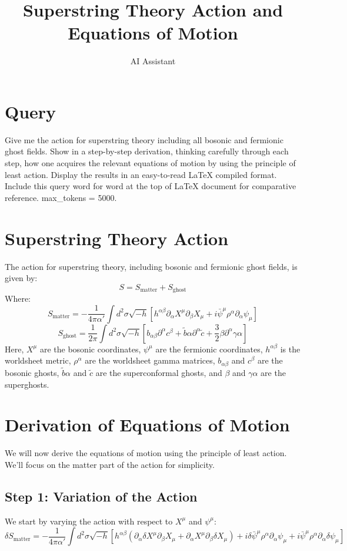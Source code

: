 \documentclass{article}
\title{Superstring Theory Action and Equations of Motion}
\author{AI Assistant}
\begin{document}
\maketitle
\section{Query}
Give me the action for superstring theory including all bosonic and fermionic ghost fields. Show in a step-by-step derivation, thinking carefully through each step, how one acquires the relevant equations of motion by using the principle of least action. Display the results in an easy-to-read LaTeX compiled format. Include this query word for word at the top of LaTeX document for comparative reference. max_tokens = 5000.
\section{Superstring Theory Action}
The action for superstring theory, including bosonic and fermionic ghost fields, is given by:
\begin{equation}
S = S_{\text{matter}} + S_{\text{ghost}}
\end{equation}
Where:
\begin{equation}
S_{\text{matter}} = -\frac{1}{4\pi\alpha'} \int d^2\sigma \sqrt{-h} \left[ h^{\alpha\beta} \partial_\alpha X^\mu \partial_\beta X_\mu + i \bar{\psi}^\mu \rho^\alpha \partial_\alpha \psi_\mu \right]
\end{equation}
\begin{equation}
S_{\text{ghost}} = \frac{1}{2\pi} \int d^2\sigma \sqrt{-h} \left[ b_{\alpha\beta} \partial^\alpha c^\beta + \tilde{b}\alpha \partial^\alpha \tilde{c} + \frac{3}{2} \beta \partial^\alpha \gamma\alpha \right]
\end{equation}
Here, $X^\mu$ are the bosonic coordinates, $\psi^\mu$ are the fermionic coordinates, $h^{\alpha\beta}$ is the worldsheet metric, $\rho^\alpha$ are the worldsheet gamma matrices, $b_{\alpha\beta}$ and $c^\beta$ are the bosonic ghosts, $\tilde{b}\alpha$ and $\tilde{c}$ are the superconformal ghosts, and $\beta$ and $\gamma\alpha$ are the superghosts.
\section{Derivation of Equations of Motion}
We will now derive the equations of motion using the principle of least action. We'll focus on the matter part of the action for simplicity.
\subsection{Step 1: Variation of the Action}
We start by varying the action with respect to $X^\mu$ and $\psi^\mu$:
\begin{equation}
\delta S_{\text{matter}} = -\frac{1}{4\pi\alpha'} \int d^2\sigma \sqrt{-h} \left[ h^{\alpha\beta} (\partial_\alpha \delta X^\mu \partial_\beta X_\mu + \partial_\alpha X^\mu \partial_\beta \delta X_\mu) + i \delta\bar{\psi}^\mu \rho^\alpha \partial_\alpha \psi_\mu + i \bar{\psi}^\mu \rho^\alpha \partial_\alpha \delta\psi_\mu \right]
\end{equation}
\end{document}

